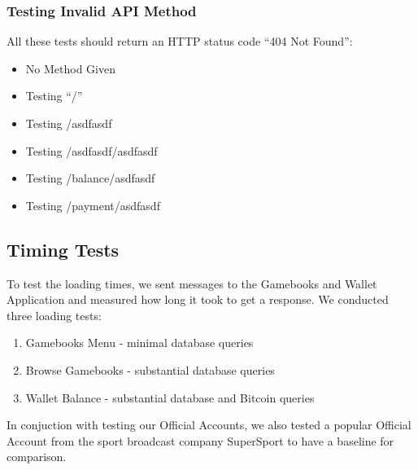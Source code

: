 \subsubsection{Testing Invalid API Method}

All these tests should return an HTTP status code ``404 Not Found'':

\begin{itemize}
	\item No Method Given
	\item Testing ``/''
	\item Testing /asdfasdf
	\item Testing /asdfasdf/asdfasdf
	\item Testing /balance/asdfasdf
	\item Testing /payment/asdfasdf
\end{itemize}	

\subsection{Timing Tests}

To test the loading times, we sent messages to the Gamebooks and Wallet Application and measured how long it took to get a response. We conducted three loading tests:

\begin{enumerate}
	\item{Gamebooks Menu - minimal database queries}
	\item{Browse Gamebooks - substantial database queries}
	\item{Wallet Balance - substantial database and Bitcoin queries}
\end{enumerate}

In conjuction with testing our Official Accounts, we also tested a popular Official Account from the sport broadcast company SuperSport to have a baseline for comparison.

